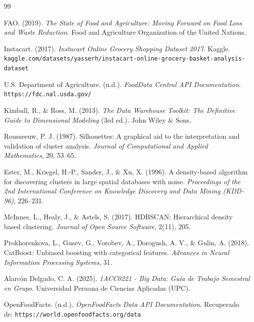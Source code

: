 \documentclass[12pt,a4paper]{article}
\begin{document}
\newpage

\begin{thebibliography}{99}

FAO. (2019). \textit{The State of Food and Agriculture: Moving Forward on Food Loss and Waste Reduction}. Food and Agriculture Organization of the United Nations.

Instacart. (2017). \textit{Instacart Online Grocery Shopping Dataset 2017}. Kaggle. \texttt{kaggle.com/datasets/yasserh/instacart-online-grocery-basket-analysis-dataset}

U.S. Department of Agriculture. (n.d.). \textit{FoodData Central API Documentation}. \texttt{https://fdc.nal.usda.gov/}

Kimball, R., \& Ross, M. (2013). \textit{The Data Warehouse Toolkit: The Definitive Guide to Dimensional Modeling} (3rd ed.). John Wiley \& Sons.

Rousseeuw, P. J. (1987). Silhouettes: A graphical aid to the interpretation and validation of cluster analysis. \textit{Journal of Computational and Applied Mathematics}, 20, 53--65.

Ester, M., Kriegel, H.-P., Sander, J., \& Xu, X. (1996). A density-based algorithm for discovering clusters in large spatial databases with noise. \textit{Proceedings of the 2nd International Conference on Knowledge Discovery and Data Mining (KDD-96)}, 226--231.

McInnes, L., Healy, J., \& Astels, S. (2017). HDBSCAN: Hierarchical density based clustering. \textit{Journal of Open Source Software}, 2(11), 205.

Prokhorenkova, L., Gusev, G., Vorobev, A., Dorogush, A. V., \& Gulin, A. (2018). CatBoost: Unbiased boosting with categorical features. \textit{Advances in Neural Information Processing Systems}, 31.

Alarc\'on Delgado, C. A. (2025). \textit{1ACC0221 - Big Data: Gu\'ia de Trabajo Semestral en Grupo}. Universidad Peruana de Ciencias Aplicadas (UPC).

OpenFoodFacts. (n.d.). \textit{OpenFoodFacts Data API Documentation}. Recuperado de: \texttt{https://world.openfoodfacts.org/data}

\end{thebibliography}
\end{document}

